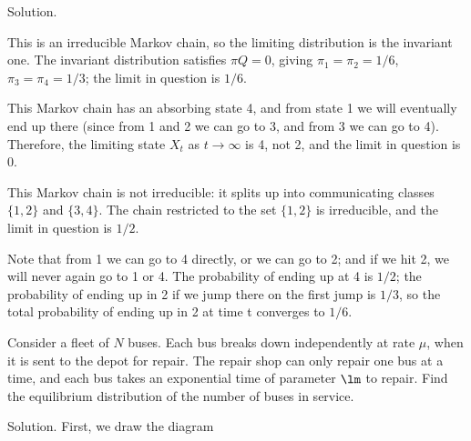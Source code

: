 Solution. \ben
\item [(a)] This is an irreducible Markov chain, so the limiting distribution is the invariant one. The invariant distribution satisfies $\pi Q = 0$, giving $\pi_1 = \pi_2 = 1/6$, $\pi_3 = \pi_4 = 1/3$; the limit in question is $1/6$.
\item [(b)] This Markov chain has an absorbing state 4, and from state 1 we will eventually end up there (since from 1 and 2 we can go to 3, and from 3 we can go to 4). Therefore, the limiting state $X_t$ as $t\to\infty$ is 4, not 2, and the limit in question is 0. 
\item [(c)] This Markov chain is not irreducible: it splits up into communicating classes $\{1, 2\}$ and $\{3, 4\}$. The chain restricted to the set $\{1, 2\}$ is irreducible, and the limit in question is $1/2$.
\item [(d)] Note that from 1 we can go to 4 directly, or we can go to 2; and if we hit 2, we will never again go to 1 or 4. The probability of ending up at 4 is $1/2$; the probability of ending up in 2 if we jump there on the first jump is $1/3$, so the total probability of ending up in 2 at time t converges to $1/6$.
\een

\vspace{2mm}

\qcutline


\begin{exercise}
Consider a fleet of $N$ buses. Each bus breaks down independently at rate $\mu$, when it is sent to the depot for repair. The repair shop can only repair one bus at a time, and each bus takes an exponential time of parameter $\lm$ to repair. Find the equilibrium distribution of the number of buses in service.
\end{exercise}


Solution. First, we draw the diagram

